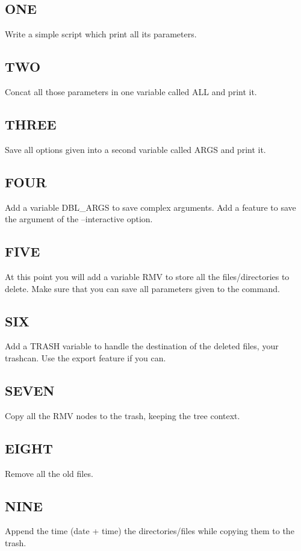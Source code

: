 \subsection{ONE}
Write a simple script which print all its parameters.

\subsection{TWO}
Concat all those parameters in one variable called ALL and print it.

\subsection{THREE}
Save all options given into a second variable called ARGS and print it.

\subsection{FOUR}
Add a variable DBL_ARGS  to save complex arguments.
Add a feature to save the argument of the --interactive option.

\subsection{FIVE}
At this point you will add a variable RMV to store all the files/directories to delete.
Make sure that you can save all parameters given to the command.

\subsection{SIX}
Add a TRASH variable to handle the destination of the deleted files, your trashcan.
Use the export feature if you can.

\subsection{SEVEN}
Copy all the RMV nodes to the trash, keeping the tree context.

\subsection{EIGHT}
Remove all the old files.

\subsection{NINE}
Append the time (date + time) the directories/files while copying them to the trash.

